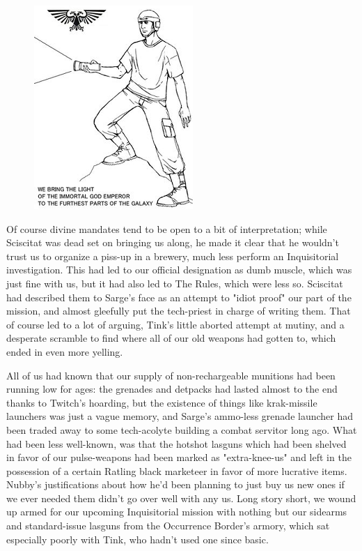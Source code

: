 \begin{figure}
	\begin{center}
		\includegraphics[width=\figwidth]{pics/17/17 Large.png}
	\end{center}
\end{figure}
Of course divine mandates tend to be open to a bit of interpretation; 
while Sciscitat was dead set on bringing us along, he made it clear that he wouldn't trust us to organize a piss-up in a brewery, much less perform an Inquisitorial investigation. 
This had led to our official designation as dumb muscle, which was just fine with us, but it had also led to The Rules, which were less so. 
Sciscitat had described them to Sarge's face as an attempt to "idiot proof" our part of the mission, and almost gleefully put the tech-priest in charge of writing them. 
That of course led to a lot of arguing, Tink's little aborted attempt at mutiny, and a desperate scramble to find where all of our old weapons had gotten to, which ended in even more yelling.

All of us had known that our supply of non-rechargeable munitions had been running low for ages: 
the grenades and detpacks had lasted almost to the end thanks to Twitch's hoarding, but the existence of things like krak-missile launchers was just a vague memory, and Sarge's ammo-less grenade launcher had been traded away to some tech-acolyte building a combat servitor long ago. 
What had been less well-known, was that the hotshot lasguns which had been shelved in favor of our pulse-weapons had been marked as "extra-knee-us" and left in the possession of a certain Ratling black marketeer in favor of more lucrative items. 
Nubby's justifications about how he'd been planning to just buy us new ones if we ever needed them didn't go over well with any us. 
Long story short, we wound up armed for our upcoming Inquisitorial mission with nothing but our sidearms and standard-issue lasguns from the Occurrence Border's armory, which sat especially poorly with Tink, who hadn't used one since basic.

